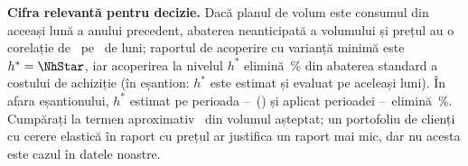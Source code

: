 %
{\textbf{Cifra relevantă pentru decizie.} Dacă planul de volum este consumul din aceeași lună a anului precedent, abaterea neanticipată a volumului și prețul au o corelație de \NcorrQP\ pe \NnHedge\ de luni; raportul de acoperire cu varianță minimă este $h^* = \NhStar$, iar acoperirea la nivelul $h^*$ elimină \NriskRed\,\% din abaterea standard a costului de achiziție (în eșantion: $h^*$ este estimat și evaluat pe aceleași luni).
În afara eșantionului, $h^*$ estimat pe perioada \NinStart--\NinEnd\ (\NhIn) și aplicat perioadei \NoutStart--\NoutEnd\ elimină \NriskRedOOS\,\%.
Cumpărați la termen aproximativ \NhStar\ din volumul așteptat; un portofoliu de clienți cu cerere elastică în raport cu prețul ar justifica un raport mai mic, dar nu acesta este cazul în datele noastre.}

